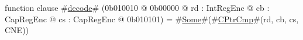 function clause #\hyperref[sailMIPSzdecode]{decode}# (0b010010 @ 0b00000 @ rd : IntRegEnc @ cb : CapRegEnc @ cs : CapRegEnc @ 0b010101) = #\hyperref[sailMIPSzSome]{Some}#(#\hyperref[sailMIPSzCPtrCmp]{CPtrCmp}#(rd, cb, cs, CNE))

